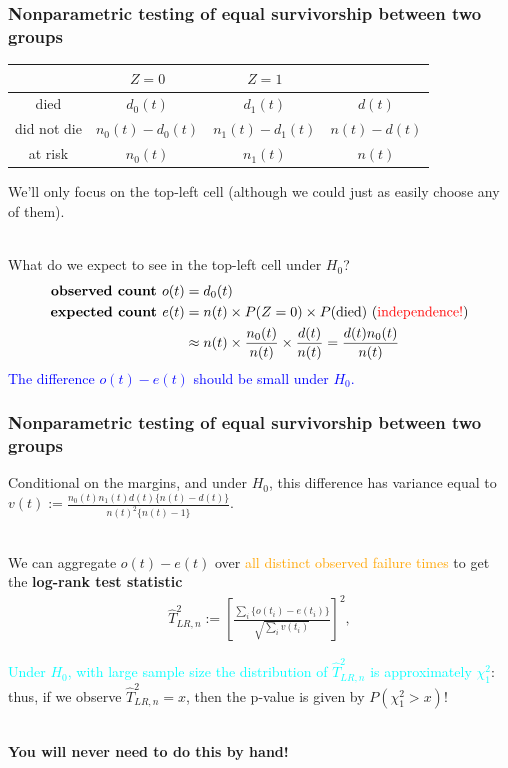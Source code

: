 \documentclass[10pt,t]{beamer}
\begin{document}
\begin{frame}
\frametitle{Nonparametric testing of equal survivorship between two groups}

\begin{center}
\begin{tabular}{c|c|c|c}
& $Z = 0$ & $Z = 1$ \\
\hline
died & $d_0(t)$ & $d_1(t)$ & $d(t)$ \\
did not die & $n_0(t) - d_0(t)$ & $n_1(t) - d_1(t)$ & $n(t) - d(t)$\\
at risk & $n_0(t)$ & $n_1(t)$ & $n(t)$
\end{tabular}
\end{center}\vspace{-0.2cm}

We'll only focus on the top-left cell (although we could just as easily choose any of them).
\\ ~\ 

What do we expect to see in the top-left cell under $H_0$?
\begin{align*}
\textbf{observed count } o(t) &= d_0(t) \\
\textbf{expected count } e(t) &= n(t) \times P(Z = 0) \times P(\text{died}) \text{  (\textcolor{red}{independence!})}\\
&\approx n(t)\times \frac{n_0(t)}{n(t)}\times  \frac{d(t)}{n(t)} = \frac{d(t)n_0(t)}{n(t)}
\end{align*}
\textcolor{blue}{The difference $o(t) - e(t)$ should be small under $H_0$.} 
\end{frame}

\begin{frame}
\frametitle{Nonparametric testing of equal survivorship between two groups}
Conditional on the margins, and under $H_0$, this difference has variance equal to $v(t) := \frac{n_0(t)n_1(t)d(t)\{n(t)-d(t)\}}{n(t)^2\{n(t) - 1\}}$.
\\ ~\ 

We can aggregate $o(t) - e(t)$ over \textcolor{orange}{all distinct observed failure times} to get the \textbf{log-rank test statistic}
\begin{align*}
\widehat{T}^2_{LR, n} := \left[\frac{\sum_i \{o(t_i) - e(t_i)\}}{\sqrt{\sum_iv(t_i)}} \right]^2,
\end{align*}

\textcolor{cyan}{Under $H_0$, with large sample size the distribution of $\widehat{T}^2_{LR, n}$ is approximately $\chi^2_1$}: thus, if we observe $\widehat{T}^2_{LR, n} = x$, then the p-value is given by $P(\chi^2_1 > x)$!
\\ ~\ 

\textbf{You will never need to do this by hand!}
\end{frame}
\end{document}
